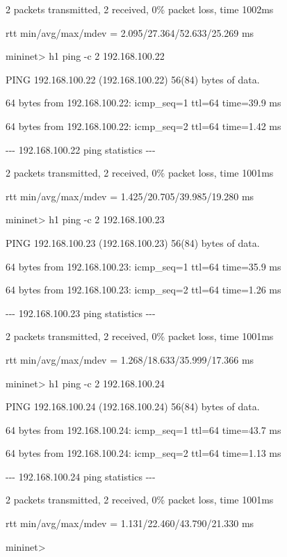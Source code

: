 2 packets transmitted, 2 received, 0\% packet loss, time 1002ms

rtt min/avg/max/mdev = 2.095/27.364/52.633/25.269 ms

mininet{\textgreater} h1 ping -c 2 192.168.100.22

PING 192.168.100.22 (192.168.100.22) 56(84) bytes of data.

64 bytes from 192.168.100.22: icmp\_seq=1 ttl=64 time=39.9 ms

64 bytes from 192.168.100.22: icmp\_seq=2 ttl=64 time=1.42 ms


\bigskip

{}-{}-{}- 192.168.100.22 ping statistics -{}-{}-

2 packets transmitted, 2 received, 0\% packet loss, time 1001ms

rtt min/avg/max/mdev = 1.425/20.705/39.985/19.280 ms

mininet{\textgreater} h1 ping -c 2 192.168.100.23

PING 192.168.100.23 (192.168.100.23) 56(84) bytes of data.

64 bytes from 192.168.100.23: icmp\_seq=1 ttl=64 time=35.9 ms

64 bytes from 192.168.100.23: icmp\_seq=2 ttl=64 time=1.26 ms


\bigskip

{}-{}-{}- 192.168.100.23 ping statistics -{}-{}-

2 packets transmitted, 2 received, 0\% packet loss, time 1001ms

rtt min/avg/max/mdev = 1.268/18.633/35.999/17.366 ms

mininet{\textgreater} h1 ping -c 2 192.168.100.24

PING 192.168.100.24 (192.168.100.24) 56(84) bytes of data.

64 bytes from 192.168.100.24: icmp\_seq=1 ttl=64 time=43.7 ms

64 bytes from 192.168.100.24: icmp\_seq=2 ttl=64 time=1.13 ms


\bigskip

{}-{}-{}- 192.168.100.24 ping statistics -{}-{}-

2 packets transmitted, 2 received, 0\% packet loss, time 1001ms

rtt min/avg/max/mdev = 1.131/22.460/43.790/21.330 ms

mininet{\textgreater}
